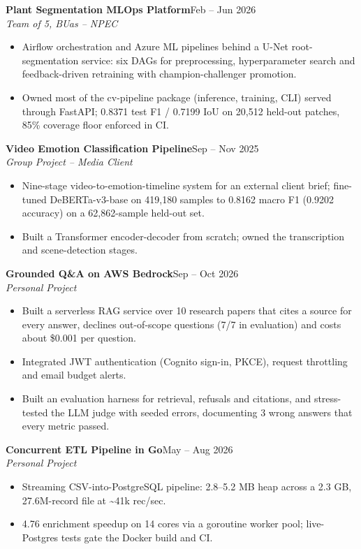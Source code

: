 \documentclass[10pt,a4paper]{article}
\newcommand{\entry}[4]{%
  \textbf{#1}\hfill #2\\
  \textit{#3}\hfill \textit{#4}\par\vspace{1pt}}
\begin{document}
\entry{Plant Segmentation MLOps Platform}{Feb -- Jun 2026}{Team of 5, BUas -- NPEC}{}
\begin{itemize}
  \item Airflow orchestration and Azure ML pipelines behind a U-Net
        root-segmentation service: six DAGs for preprocessing, hyperparameter
        search and feedback-driven retraining with champion-challenger promotion.
  \item Owned most of the cv-pipeline package (inference, training, CLI)
        served through FastAPI; 0.8371 test F1 / 0.7199 IoU on 20,512 held-out
        patches, 85\% coverage floor enforced in CI.
\end{itemize}

\entry{Video Emotion Classification Pipeline}{Sep -- Nov 2025}{Group Project -- Media Client}{}
\begin{itemize}
  \item Nine-stage video-to-emotion-timeline system for an external client brief;
        fine-tuned DeBERTa-v3-base on 419,180 samples to 0.8162 macro F1
        (0.9202 accuracy) on a 62,862-sample held-out set.
  \item Built a Transformer encoder-decoder from scratch; owned the transcription
        and scene-detection stages.
\end{itemize}

\entry{Grounded Q\&A on AWS Bedrock}{Sep -- Oct 2026}{Personal Project}{}
\begin{itemize}
  \item Built a serverless RAG service over 10 research papers that cites a source
        for every answer, declines out-of-scope questions (7/7 in evaluation) and
        costs about \$0.001 per question.
  \item Integrated JWT authentication (Cognito sign-in, PKCE), request throttling
        and email budget alerts.
  \item Built an evaluation harness for retrieval, refusals and citations, and
        stress-tested the LLM judge with seeded errors, documenting 3 wrong answers
        that every metric passed.
\end{itemize}

\entry{Concurrent ETL Pipeline in Go}{May -- Aug 2026}{Personal Project}{}
\begin{itemize}
  \item Streaming CSV-into-PostgreSQL pipeline: 2.8--5.2 MB heap across a 2.3 GB,
        27.6M-record file at \textasciitilde{}41k rec/sec.
  \item 4.76\texttimes{} enrichment speedup on 14 cores via a goroutine worker
        pool; live-Postgres tests gate the Docker build and CI.
\end{itemize}
\end{document}
